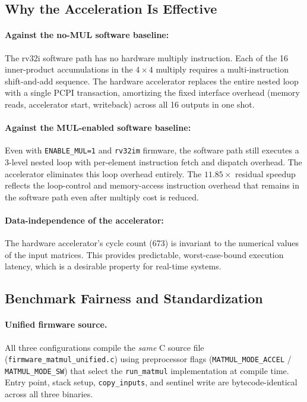 ﻿\documentclass[12pt,a4paper]{report}
\begin{document}
\subsection{Why the Acceleration Is Effective}

\paragraph{Against the no-MUL software baseline:}
The rv32i software path has no hardware multiply instruction.
Each of the 16 inner-product accumulations in the $4 \times 4$ multiply requires a multi-instruction shift-and-add sequence.
The hardware accelerator replaces the entire nested loop with a single PCPI transaction, amortizing the fixed interface overhead (memory reads, accelerator start, writeback) across all 16 outputs in one shot.

\paragraph{Against the MUL-enabled software baseline:}
Even with \texttt{ENABLE\_MUL=1} and \texttt{rv32im} firmware, the software path still executes a 3-level nested loop with per-element instruction fetch and dispatch overhead.
The accelerator eliminates this loop overhead entirely.
The $11.85\times$ residual speedup reflects the loop-control and memory-access instruction overhead that remains in the software path even after multiply cost is reduced.

\paragraph{Data-independence of the accelerator:}
The hardware accelerator's cycle count (673) is invariant to the numerical values of the input matrices.
This provides predictable, worst-case-bound execution latency, which is a desirable property for real-time systems.

\subsection{Benchmark Fairness and Standardization}

\paragraph{Unified firmware source.}
All three configurations compile the \emph{same} C source file
(\texttt{firmware\_matmul\_unified.c}) using preprocessor flags
(\texttt{MATMUL\_MODE\_ACCEL} / \texttt{MATMUL\_MODE\_SW}) that select the
\texttt{run\_matmul} implementation at compile time.
Entry point, stack setup, \texttt{copy\_inputs}, and sentinel write are
bytecode-identical across all three binaries.
\end{document}
